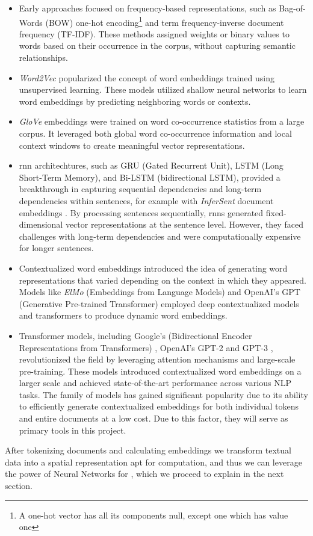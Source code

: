 \begin{itemize}
    \item Early approaches focused on frequency-based representations, such as Bag-of-Words (BOW) one-hot encoding\footnote{A one-hot vector has all its components null, except one which has value one} and term frequency-inverse document frequency (TF-IDF). These methods assigned weights or binary values to words based on their occurrence in the corpus, without capturing semantic relationships.
    \item \emph{Word2Vec}  popularized the concept of word embeddings trained using unsupervised learning. These models utilized shallow neural networks to learn word embeddings by predicting neighboring words or contexts. 
    \item \emph{GloVe} embeddings   were trained on word co-occurrence statistics from a large corpus. It leveraged both global word co-occurrence information and local context windows to create meaningful vector representations.
    \item \gls{rnn} architechtures, such as GRU (Gated Recurrent Unit), LSTM (Long Short-Term Memory),  and Bi-LSTM (bidirectional LSTM), provided a breakthrough in capturing sequential dependencies and long-term dependencies within sentences, for example with \emph{InferSent} document embeddings . By processing sentences sequentially, \gls{rnn}s generated fixed-dimensional vector representations at the sentence level. However, they faced challenges with long-term dependencies and were computationally expensive for longer sentences.
    
    \item  Contextualized word embeddings introduced the idea of generating word representations that varied depending on the context in which they appeared. Models like \emph{ElMo} (Embeddings from Language Models)  and OpenAI's GPT (Generative Pre-trained Transformer)  employed deep contextualized models and transformers to produce dynamic word embeddings.
    \item Transformer models, including Google's \BERT{} (Bidirectional Encoder Representations from Transformers) , OpenAI's GPT-2  and GPT-3 , revolutionized the field by leveraging attention mechanisms and large-scale pre-training. These models introduced contextualized word embeddings on a larger scale and achieved state-of-the-art performance across various NLP tasks. The \BERT{} family of models has gained significant popularity due to its ability to efficiently generate contextualized embeddings for both individual tokens and entire documents at a low cost. Due to this factor, they will serve as primary tools in this project.
\end{itemize}

After tokenizing documents and calculating embeddings we transform textual data into a spatial representation apt for computation, and thus we can leverage the power of Neural Networks for \textclassification{}, which we proceed to explain in the next section.
